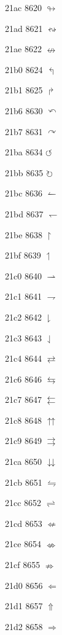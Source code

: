 \documentclass[11pt]{article}
\begin{document}
21ac 8620 \ensuremath{\looparrowright}

21ad 8621 \ensuremath{\leftrightsquigarrow}

21ae 8622 \ensuremath{\nleftrightarrow}

21b0 8624 \ensuremath{\Lsh}

21b1 8625 \ensuremath{\Rsh}


21b6 8630 \ensuremath{\curvearrowleft}

21b7 8631 \ensuremath{\curvearrowright}

21ba 8634 \ensuremath{\circlearrowleft}

21bb 8635 \ensuremath{\circlearrowright}

21bc 8636 \ensuremath{\leftharpoonup}

21bd 8637 \ensuremath{\leftharpoondown}

21be 8638 \ensuremath{\upharpoonright}

21bf 8639 \ensuremath{\upharpoonleft}

21c0 8640 \ensuremath{\rightharpoonup}

21c1 8641 \ensuremath{\rightharpoondown}

21c2 8642 \ensuremath{\downharpoonright}

21c3 8643 \ensuremath{\downharpoonleft}

21c4 8644 \ensuremath{\rightleftarrows}


21c6 8646 \ensuremath{\leftrightarrows}

21c7 8647 \ensuremath{\leftleftarrows}

21c8 8648 \ensuremath{\upuparrows}

21c9 8649 \ensuremath{\rightrightarrows}

21ca 8650 \ensuremath{\downdownarrows}

21cb 8651 \ensuremath{\leftrightharpoons}

21cc 8652 \ensuremath{\rightleftharpoons}

21cd 8653 \ensuremath{\nLeftarrow}

21ce 8654 \ensuremath{\nLeftrightarrow}

21cf 8655 \ensuremath{\nRightarrow}

21d0 8656 \ensuremath{\Leftarrow}

21d1 8657 \ensuremath{\Uparrow}

21d2 8658 \ensuremath{\Rightarrow}
\end{document}
